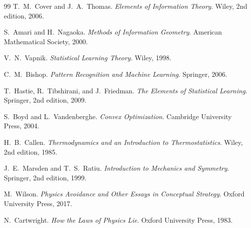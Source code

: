 \documentclass[12pt,openany]{book}
\begin{document}
\begin{thebibliography}{99}
T.~M.~Cover and J.~A.~Thomas.
\newblock \textit{Elements of Information Theory}.
\newblock Wiley, 2nd edition, 2006.

S.~Amari and H.~Nagaoka.
\newblock \textit{Methods of Information Geometry}.
\newblock American Mathematical Society, 2000.

V.~N.~Vapnik.
\newblock \textit{Statistical Learning Theory}.
\newblock Wiley, 1998.

C.~M.~Bishop.
\newblock \textit{Pattern Recognition and Machine Learning}.
\newblock Springer, 2006.

T.~Hastie, R.~Tibshirani, and J.~Friedman.
\newblock \textit{The Elements of Statistical Learning}.
\newblock Springer, 2nd edition, 2009.

S.~Boyd and L.~Vandenberghe.
\newblock \textit{Convex Optimization}.
\newblock Cambridge University Press, 2004.

H.~B.~Callen.
\newblock \textit{Thermodynamics and an Introduction to Thermostatistics}.
\newblock Wiley, 2nd edition, 1985.

J.~E.~Marsden and T.~S.~Ratiu.
\newblock \textit{Introduction to Mechanics and Symmetry}.
\newblock Springer, 2nd edition, 1999.

M.~Wilson.
\newblock \textit{Physics Avoidance and Other Essays in Conceptual Strategy}.
\newblock Oxford University Press, 2017.

N.~Cartwright.
\newblock \textit{How the Laws of Physics Lie}.
\newblock Oxford University Press, 1983.

\end{thebibliography}
\end{document}
